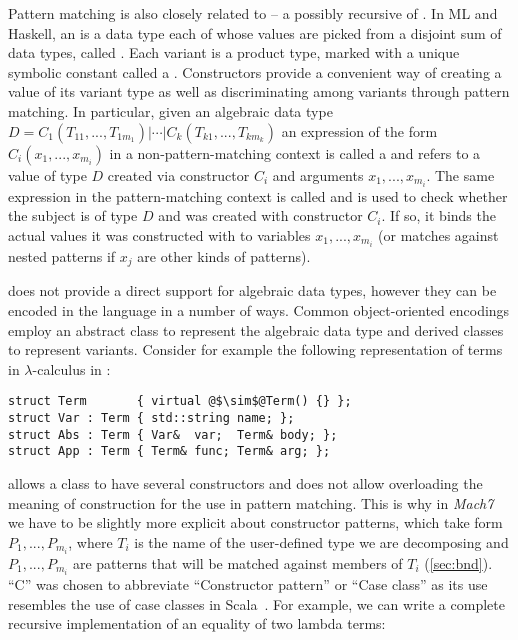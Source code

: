 
Pattern matching is also closely related to  -- a 
possibly recursive  of . In ML and Haskell, an 
 is a data type each of whose values are picked from a 
disjoint sum of data types, called . Each variant is a product 
type, marked with a unique symbolic constant called a . 
Constructors provide a convenient way of creating a value of its variant type as 
well as discriminating among variants through pattern matching. In particular,
given an algebraic data type $D = C_1(T_{11},...,T_{1m_1}) | \cdots | C_k(T_{k1},...,T_{km_k})$
an expression of the form $C_i(x_1,...,x_{m_i})$ in a non-pattern-matching 
context is called a  and refers to a value of type $D$ 
created via constructor $C_i$ and arguments $x_1,...,x_{m_i}$. The same 
expression in the pattern-matching context is called  
and is used to check whether the subject is of type $D$ and was created with 
constructor $C_i$. If so, it binds the actual values it was constructed with to  
variables $x_1,...,x_{m_i}$ (or matches against nested patterns if $x_j$ are 
other kinds of patterns).

\Cpp{} does not provide a direct support for algebraic data types, however they 
can be encoded in the language in a number of ways. Common 
object-oriented encodings employ an abstract class to represent the 
algebraic data type and derived classes to represent variants. Consider for 
example the following representation of terms in $\lambda$-calculus in \Cpp{}:

\begin{lstlisting}[columns=flexible]
struct Term       { virtual @$\sim$@Term() {} };
struct Var : Term { std::string name; };
struct Abs : Term { Var&  var;  Term& body; };
struct App : Term { Term& func; Term& arg; };
\end{lstlisting}

\noindent
\Cpp{} allows a class to have several constructors and does not allow 
overloading the meaning of construction for the use in pattern matching. This is
why in \emph{Mach7} we have to be slightly more explicit about constructor patterns, 
which take form $P_1,...,P_{m_i}$\code{)}, where $T_i$ is the name of 
the user-defined type we are decomposing and $P_1,...,P_{m_i}$ are patterns that 
will be matched against members of $T_i$ (\textsection\ref{sec:bnd}). ``C'' was
chosen to abbreviate ``Constructor pattern'' or ``Case class'' as its use 
resembles the use of case classes in Scala~\cite{Scala2nd}.
For example, we can write a complete 
recursive implementation of an equality of two lambda terms:

